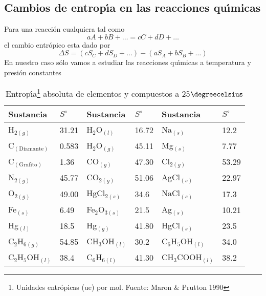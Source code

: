\subsection{Cambios de entrop\'{\i}a en las reacciones qu\'{\i}micas}
Para una reacci\'on cual\-quie\-ra tal como
\begin{equation}
aA +bB +\ldots = cC + dD + \ldots
\end{equation}
el cambio entr\'opico esta dado por
\begin{equation}
\Delta S = (cS_C + dS_D + \ldots) - (aS_A + bS_B + \ldots)
\end{equation}
En nuestro caso s\'olo vamos a estudiar las reacciones qu\'{\i}micas a tem\-pe\-ratura y presi\'on constantes

\begin{table} [ht]
\begin{minipage}{\linewidth}
\caption[Entrop\'{\i}a absoluta]{Entrop\'{\i}a\footnote{Unidades entr\'opicas (ue) por
mol. Fuente:  Maron \& Prutton 1990} absoluta  de  elementos y compuestos a 25$\degreecelsius$}
\begin{center}
{\small \begin{tabular}{||ll|ll|ll||} \hline
\textbf{Sustancia}&\textbf{$S ^\circ$}&\textbf{Sustancia}&\textbf{$S^\circ$}
&\textbf{Sustancia}&\textbf{$S^\circ$}\\ \hline
 H$_{2(g)}$        & 31.21  & H$_2$O$_{(l)}$  & 16.72 & Na$_{(s)}$  & 12.2 \\ 
 C$_{(\mathrm{Diamante})}$  & 0.583  & H$_2$O$_{(g)}$  & 45.11 & Mg$_{(s)}$  & 7.77 \\ 
 C$_{(\mathrm{Grafito})}$   & 1.36   & CO$_{(g)}$      & 47.30 & Cl$_{2(g)}$ & 53.29\\ 
 N$_{2(g)}$        & 45.77  & CO$_{2(g)}$     & 51.06 & AgCl$_{(s)}$& 22.97\\
 O$_{2(g)}$        & 49.00  & HgCl$_{2(s)}$   & 34.6  & NaCl$_{(s)}$& 17.3 \\
 Fe$_{(s)}$        & 6.49   & Fe$_2$O$_{3(s)}$& 21.5  & Ag$_{(s)}$  & 10.21\\
 Hg$_{(l)}$        & 18.5   & Hg$_{(g)}$      & 41.80 & HgCl$_{(s)}$ & 23.5\\
 C$_2$H$_{6(g)}$   & 54.85  & CH$_3$OH$_{(l)}$& 30.2  & C$_6$H$_5$OH$_{(l)}$& 34.0\\
 C$_2$H$_5$OH$_{(l)}$&38.4  & C$_6$H$_{6(l)}$ & 41.30 & CH$_3$COOH$_{(l)}$&38.2 \\
 \hline 
\end{tabular}}
\label{tab:4}
\end{center}
\end{minipage}
\end{table}

